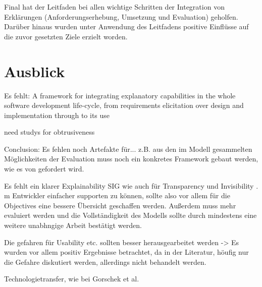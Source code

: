 



Final hat der Leitfaden bei allen wichtige Schritten der Integration von Erklärungen (Anforderungserhebung, Umsetzung und Evaluation) geholfen. Darüber hinaus wurden unter Anwendung des Leitfadens positive Einflüsse auf die zuvor gesetzten Ziele erzielt worden. 

\section{Ausblick}



Es fehlt: A framework for integrating explanatory capabilities in the whole software development life-cycle, from requirements elicitation over design and implementation through to its use \cite{cassens_ambient_2019}

need studys for obtrusiveness \cite{lim_2009_assessing}

Conclusion: Es fehlen noch Artefakte für... z.B. aus den im Modell gesammelten Möglichkeiten der Evaluation muss noch ein konkretes Framework gebaut werden, wie es von \citeauthor{sokol_explainability_2020} gefordert wird.

Es fehlt ein klarer Explainability SIG wie auch für Transparency \cite{do2010software} und Invisibility \cite{carvalho2020developers}. m Entwickler einfacher supporten zu können, sollte also vor allem für die Objectives eine bessere Übersicht geschaffen werden.
Außerdem muss mehr evaluiert werden und die Vollständigkeit des Modells sollte durch mindestens eine weitere unabhngige Arbeit bestätigt werden.

Die gefahren für Usability etc. sollten besser herausgearbeitet werden -> Es wurden vor allem positiv Ergebnisse betrachtet, da in der Literatur, höufig nur die Gefahre diskutiert werden, allerdings nicht behandelt werden.

Technologietransfer, wie bei Gorschek et al.

